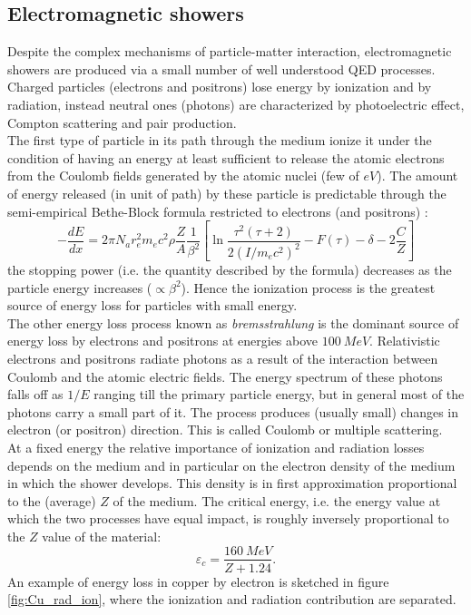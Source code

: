 \subsection{Electromagnetic showers} \label{subsec:em_shower}
Despite the complex mechanisms of particle-matter interaction, electromagnetic showers are produced via a small number of well understood QED processes. Charged particles (electrons and positrons) lose energy by ionization and by radiation, instead neutral ones (photons) are characterized by photoelectric effect, Compton scattering and pair production.\\

The first type of particle in its path through the medium ionize it under the condition of having an energy at least sufficient to release the atomic electrons from the Coulomb fields generated by the atomic nuclei (few of $eV$).
The amount of energy released (in unit of path) by these particle is predictable through the semi-empirical Bethe-Block formula restricted to electrons (and positrons) \cite{Leo}:
\begin{equation}
    -\frac{dE}{dx} = 2\pi N_a r_e^2 m_e c^2 \rho \frac{Z}{A}\frac{1}{\beta^2}\left[ \ln{\frac{\tau^2(\tau + 2)}{2(I/m_ec^2)^2}} -F(\tau) -\delta -2\frac{C}{Z}\right]
\end{equation}
the stopping power (i.e. the quantity described by the formula) decreases as the particle energy increases ($\propto \beta^2$). Hence the ionization process is the greatest source of energy loss for particles with small energy.\\
The other energy loss process known as \textit{bremsstrahlung} is the dominant source of energy loss by electrons and positrons at energies above $100\ MeV$. Relativistic electrons and positrons radiate photons as a result of the interaction between Coulomb and the atomic electric fields. The energy spectrum of these photons falls off as $1/E$ ranging till the primary particle energy, but in general most of the photons carry a small part of it.
The process produces (usually small) changes in electron (or positron) direction. This is called Coulomb or multiple scattering.\\
At a fixed energy the relative importance of ionization and radiation losses depends on the medium and in particular on the electron density of the medium in which the shower develops. This density is in first approximation proportional to the (average) $Z$ of the medium.
The critical energy, i.e. the energy value at which the two processes have equal impact, is roughly inversely proportional to the $Z$ value of the material:
\begin{equation}
    \varepsilon_c = \frac{160\ MeV}{Z + 1.24}.
\end{equation}
An example of energy loss in copper by electron is sketched in figure \ref{fig:Cu_rad_ion}, where the ionization and radiation contribution are separated.\\

